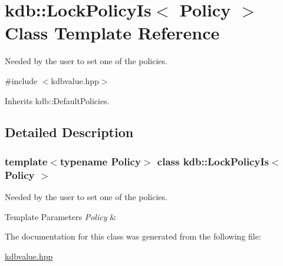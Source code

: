 \hypertarget{classkdb_1_1LockPolicyIs}{}\section{kdb\+::Lock\+Policy\+Is$<$ Policy $>$ Class Template Reference}
\label{classkdb_1_1LockPolicyIs}


Needed by the user to set one of the policies.  




{\ttfamily \#include $<$kdbvalue.\+hpp$>$}



Inherits kdb\+::\+Default\+Policies.



\subsection{Detailed Description}
\subsubsection*{template$<$typename Policy$>$\newline
class kdb\+::\+Lock\+Policy\+Is$<$ Policy $>$}

Needed by the user to set one of the policies. 


\begin{DoxyTemplParams}{Template Parameters}
{\em Policy} & \\
\hline
\end{DoxyTemplParams}


The documentation for this class was generated from the following file\+:\begin{DoxyCompactItemize}
\item 
\mbox{\hyperlink{kdbvalue_8hpp}{kdbvalue.\+hpp}}\end{DoxyCompactItemize}
